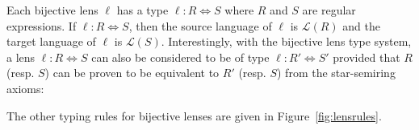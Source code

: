 \documentclass{svproc}
\begin{document}
Each bijective lens $\ell$ has a type $\ell : R \Leftrightarrow S$ where $R$ and
$S$ are regular expressions. If $\ell : R \Leftrightarrow S$, then the source
language of $\ell$ is $\mathcal{L}(R)$ and the target language of $\ell$ is
$\mathcal{L}(S)$. Interestingly, with the bijective lens type system, a lens
$\ell : R \Leftrightarrow S$ can also be considered to be of type $\ell : R'
\Leftrightarrow S'$ provided that $R$ (resp. $S$) can be proven to be
equivalent to $R'$ (resp. $S$) from the star-semiring axioms:

\begin{prooftree}
\end{prooftree}

The other typing rules for bijective lenses are given in
Figure~\ref{fig:lensrules}.
\end{document}
